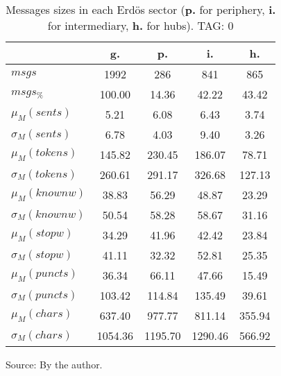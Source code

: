 \begin{table}[h!]
\begin{center}
	\caption{Messages sizes in each Erd\"os sector ({{\bf p.}} for periphery, {{\bf i.}} for intermediary, {{\bf h.}} for hubs). TAG: 0}\label{tab:sizesMsgs}
\begin{tabular}{| l || c | c | c | c |}\hline
 & {\bf g.} & {\bf p.} & {\bf i.} & {\bf h.} \\\hline\hline
$msgs$ & 1992  & 286  & 841  & 865 \\
$msgs_{\%}$ & 100.00  & 14.36  & 42.22  & 43.42 \\\hline
$\mu_M(sents)$ & 5.21  & 6.08  & 6.43  & 3.74 \\
$\sigma_M(sents)$ & 6.78  & 4.03  & 9.40  & 3.26 \\\hline
$\mu_M(tokens)$ & 145.82  & 230.45  & 186.07  & 78.71 \\
$\sigma_M(tokens)$ & 260.61  & 291.17  & 326.68  & 127.13 \\\hline
$\mu_M(knownw)$ & 38.83  & 56.29  & 48.87  & 23.29 \\
$\sigma_M(knownw)$ & 50.54  & 58.28  & 58.67  & 31.16 \\\hline
$\mu_M(stopw)$ & 34.29  & 41.96  & 42.42  & 23.84 \\
$\sigma_M(stopw)$ & 41.11  & 32.32  & 52.81  & 25.35 \\\hline
$\mu_M(puncts)$ & 36.34  & 66.11  & 47.66  & 15.49 \\
$\sigma_M(puncts)$ & 103.42  & 114.84  & 135.49  & 39.61 \\\hline
$\mu_M(chars)$ & 637.40  & 977.77  & 811.14  & 355.94 \\
$\sigma_M(chars)$ & 1054.36  & 1195.70  & 1290.46  & 566.92 \\\hline
\end{tabular}
\begin{flushleft}
		Source: By the author.\
\end{flushleft}
\end{center}
\end{table}
